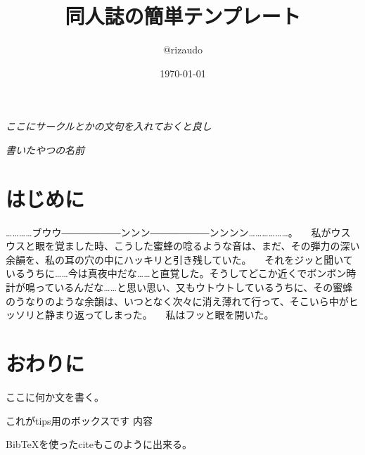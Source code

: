 \documentclass[tombo,b5paper]{ltjsbook}
\author{@rizaudo}
\date{\today}
\title{同人誌の簡単テンプレート}
\begin{document}
\maketitle

\thispagestyle{empty}
\begin{center}
\begin{minipage}{0.85\hsize}
  \begin{large}
    \textit{ここにサークルとかの文句を入れておくと良し}
    \begin{flushright}
      \textit{書いたやつの名前}
    \end{flushright}
  \end{large}
\end{minipage}
\end{center}

\cleardoublepage


\section{はじめに}
…………ブウウ――――――ンンン――――――ンンンン………………。
　私がウスウスと眼を覚ました時、こうした蜜蜂の唸るような音は、まだ、その弾力の深い余韻を、私の耳の穴の中にハッキリと引き残していた。
　それをジッと聞いているうちに……今は真夜中だな……と直覚した。そうしてどこか近くでボンボン時計が鳴っているんだな……と思い思い、又もウトウトしているうちに、その蜜蜂のうなりのような余韻は、いつとなく次々に消え薄れて行って、そこいら中がヒッソリと静まり返ってしまった。
　私はフッと眼を開いた。





\section{おわりに}
ここに何か文を書く。
\begin{tips}{これがtips用のボックスです}
内容
\end{tips}
BibTeXを使ったciteもこのように\cite{Vinyals2015}出来る。
\listoftodos[TODOの一覧が出せるぞ]
\printbibliography[segment=\therefsegment, title=参考文献]
\end{document}
